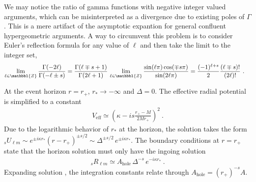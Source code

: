 We may notice the ratio of gamma functions with negative integer valued arguments, which can be misinterpreted as a divergence due to existing poles of $\Gamma$.
This is a mere artifact of the asymptotic expantion for general confluent hypergeometric arguments.
A way to circumvent this problem is to consider Euler's reflection formula for any value of $\ell$ and then take the limit to the integer set,
\begin{align}
    \label{eq3:negativeGammaRatio}
    \lim_{\ell\in\mathbbl{Z}} \frac{\Gamma(-2\ell)}{\Gamma(-\ell\pm s)} &= \frac{\Gamma(\ell\mp s+1)}{\Gamma(2\ell+1)} \, \lim_{\ell\in\mathbbl{Z}} \frac{\sin(\ell\pi)\cos(\mp s \pi)}{\sin(2\ell\pi)} = \frac{(-1)^{\ell+s}}{2} \frac{(\ell \mp s)!}{(2\ell)!} ~.
\end{align}
 
At the event horizon $r=r_+$, $r_*\to-\infty$ and $\Delta=0$.
The effective radial potential is simplified to a constant
\begin{align}
    V_\mathrm{eff} \simeq \left( \kappa- i s \frac{r_+ - M}{2 M r_+} \right)^2 ~.
\end{align}
Due to the logarithmic behavior of $r_*$ at the horizon, the solution takes the form ${}_{s}U_{\ell m}\sim e^{\pm i \kappa r_{*} } (r-r_{+})^{\pm s/2} \sim \Delta^{\pm s/2} \,e^{\pm i \kappa r_{*} }$. The boundary conditions at $r=r_{+}$ state that the horizon solution must only have the ingoing solution
\begin{align}
    \label{eq3:boundaryR}
    {}_{s}R_{\ell m} \simeq A_\mathrm{hole} \,\Delta^{-s} \,e^{- i \kappa r_{*} } ~.
\end{align}
Expanding solution , the integration constants relate through $A_\mathrm{hole} = (r_{+})^{-s} A$.

